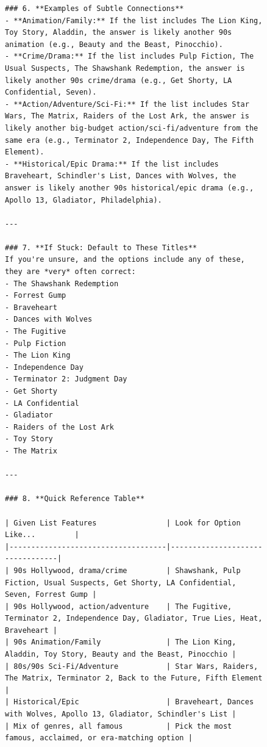 \begin{figure}[t]
\centering
\begin{tcolorbox}[title=Cheat Sheet for Movie Recommendation (2/2), colback=gray!10, colframe=black!70, boxrule=0.5pt, top=0pt, bottom=0pt, left=0pt, right=0pt, arc=0.8mm, width=1.0\textwidth]
\scriptsize
\begin{lstlisting}
### 6. **Examples of Subtle Connections**
- **Animation/Family:** If the list includes The Lion King, Toy Story, Aladdin, the answer is likely another 90s animation (e.g., Beauty and the Beast, Pinocchio).
- **Crime/Drama:** If the list includes Pulp Fiction, The Usual Suspects, The Shawshank Redemption, the answer is likely another 90s crime/drama (e.g., Get Shorty, LA Confidential, Seven).
- **Action/Adventure/Sci-Fi:** If the list includes Star Wars, The Matrix, Raiders of the Lost Ark, the answer is likely another big-budget action/sci-fi/adventure from the same era (e.g., Terminator 2, Independence Day, The Fifth Element).
- **Historical/Epic Drama:** If the list includes Braveheart, Schindler's List, Dances with Wolves, the answer is likely another 90s historical/epic drama (e.g., Apollo 13, Gladiator, Philadelphia).

---

### 7. **If Stuck: Default to These Titles**
If you're unsure, and the options include any of these, they are *very* often correct:
- The Shawshank Redemption
- Forrest Gump
- Braveheart
- Dances with Wolves
- The Fugitive
- Pulp Fiction
- The Lion King
- Independence Day
- Terminator 2: Judgment Day
- Get Shorty
- LA Confidential
- Gladiator
- Raiders of the Lost Ark
- Toy Story
- The Matrix

---

### 8. **Quick Reference Table**

| Given List Features                | Look for Option Like...         |
|------------------------------------|---------------------------------|
| 90s Hollywood, drama/crime         | Shawshank, Pulp Fiction, Usual Suspects, Get Shorty, LA Confidential, Seven, Forrest Gump |
| 90s Hollywood, action/adventure    | The Fugitive, Terminator 2, Independence Day, Gladiator, True Lies, Heat, Braveheart |
| 90s Animation/Family               | The Lion King, Aladdin, Toy Story, Beauty and the Beast, Pinocchio |
| 80s/90s Sci-Fi/Adventure           | Star Wars, Raiders, The Matrix, Terminator 2, Back to the Future, Fifth Element |
| Historical/Epic                    | Braveheart, Dances with Wolves, Apollo 13, Gladiator, Schindler's List |
| Mix of genres, all famous          | Pick the most famous, acclaimed, or era-matching option |


\end{lstlisting}
\end{tcolorbox}
\end{figure}
